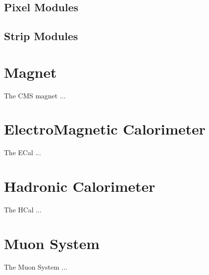 \subsection{Pixel Modules}



\subsection{Strip Modules}


\section{Magnet}
\label{sec:Magnet}

The CMS magnet ...

\section{ElectroMagnetic Calorimeter}
\label{sec:ECal}

The ECal ...

\section{Hadronic Calorimeter}
\label{sec:HCal}

The HCal ...

\section{Muon System}
\label{sec:Muon System}

The Muon System ...
